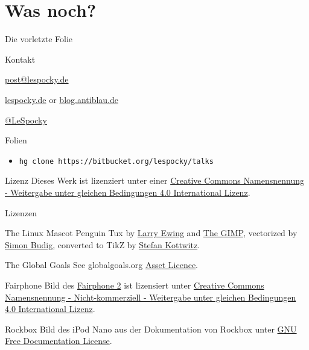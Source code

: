 \documentclass[t]{beamer}
\begin{document}
\section*{Was noch?}

\begin{frame}{Die vorletzte Folie}
    \begin{block}{Kontakt}
        \begin{description}[Twitter]
            \item [E-Mail] \href{mailto:post@lespocky.de}{post@lespocky.de}
            \item [WWW] \href{http://www.lespocky.de/}{lespocky.de} or
                    \href{http://blog.antiblau.de/}{blog.antiblau.de}
            \item [Twitter] \href{https://twitter.com/LeSpocky}{@LeSpocky}
        \end{description}
    \end{block}
    \begin{block}{Folien}
        \begin{itemize}
            \item \texttt{hg clone https://bitbucket.org/lespocky/talks}
        \end{itemize}
    \end{block}
    \begin{block}{Lizenz}
        Dieses Werk ist lizenziert unter einer
        \href{http://creativecommons.org/licenses/by-sa/4.0/}{Creative Commons
        Namensnennung - Weitergabe unter gleichen Bedingungen 4.0 International
        Lizenz}.
    \end{block}
\end{frame}


\begin{frame}{Lizenzen}
    \begin{block}{The Linux Mascot}
        Penguin Tux by \href{mailto:lewing@isc.tamu.edu}{Larry Ewing}
        and \href{http://isc.tamu.edu/~lewing/linux/}{The GIMP},
        vectorized by \href{http://www.home.unix-ag.org/simon/}{Simon Budig},
        converted to TikZ by
        \href{http://www.texample.net/weblog/2012/apr/28/tux-tex-tikz/}{Stefan Kottwitz}.
    \end{block}
    \begin{block}{The Global Goals}
        See globalgoals.org
        \href{https://www.globalgoals.org/asset-licence}{Asset Licence}.
    \end{block}
    \begin{block}{Fairphone}
        Bild des \href{https://shop.fairphone.com/de/}{Fairphone 2} ist
        lizensiert unter
        \href{https://creativecommons.org/licenses/by-nc-sa/4.0/}{Creative
        Commons Namensnennung - Nicht-kommerziell - Weitergabe unter
        gleichen Bedingungen 4.0 International Lizenz}.
    \end{block}
    \begin{block}{Rockbox}
        Bild des iPod Nano aus der Dokumentation von Rockbox unter
        \href{https://download.rockbox.org/daily/manual/rockbox-ipodnano2g/rockbox-buildap9.html}{GNU Free Documentation License}.
    \end{block}
\end{frame}
\end{document}
